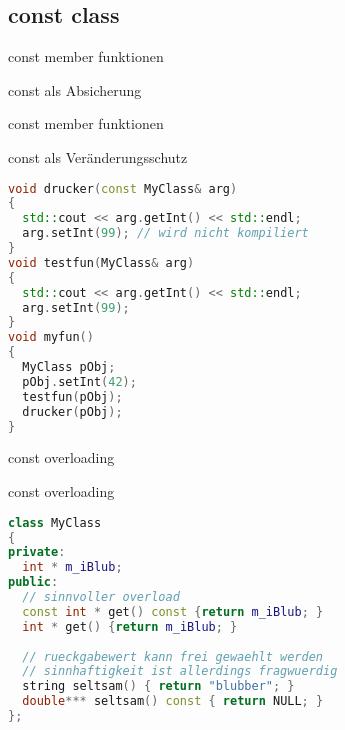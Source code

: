 
\subsection{const class}
\begin{frame}[fragile]{const member funktionen}

\begin{block}{const als Absicherung}
  
\end{block}

\end{frame}

\begin{frame}[fragile]{const member funktionen}

\begin{block}{const als Veränderungsschutz}
\begin{small}
	\begin{lstlisting}[language=C++]
void drucker(const MyClass& arg)
{
  std::cout << arg.getInt() << std::endl;
  arg.setInt(99); // wird nicht kompiliert
}
void testfun(MyClass& arg)
{
  std::cout << arg.getInt() << std::endl;
  arg.setInt(99);
}
void myfun()
{
  MyClass pObj;
  pObj.setInt(42);
  testfun(pObj);
  drucker(pObj);
}
	\end{lstlisting}
	\end{small}
\end{block}

\end{frame}


\begin{frame}[fragile]{const overloading}

\begin{block}{const overloading}
\begin{small}
	\begin{lstlisting}[language=C++]
class MyClass
{
private:
  int * m_iBlub;
public:
  // sinnvoller overload
  const int * get() const {return m_iBlub; }
  int * get() {return m_iBlub; }
  
  // rueckgabewert kann frei gewaehlt werden
  // sinnhaftigkeit ist allerdings fragwuerdig
  string seltsam() { return "blubber"; }
  double*** seltsam() const { return NULL; }
};
	\end{lstlisting}
	\end{small}
\end{block}

\end{frame}

